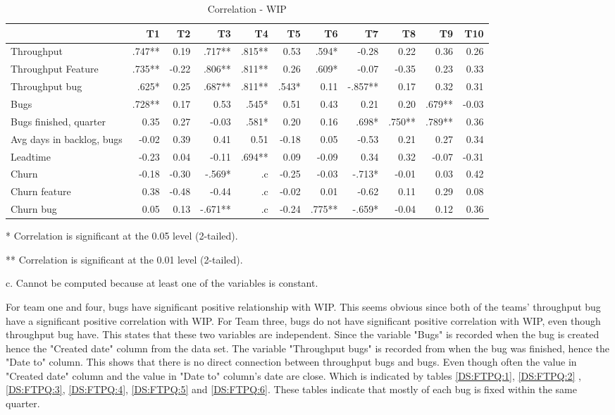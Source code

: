 \documentclass[UKenglish]{ifimaster}  %
\begin{document}
\begin{table}[!htbp]
 \begin{adjustwidth}{-2.5cm}{}
 \centering
 \begin{tabular}{|l|r|r|r|r|r|r|r|r|r|r|}
\hline
 & T1 & T2 & T3 & T4 & T5 & T6 & T7 & T8 & T9 & T10\\ \hline
Throughput &.747**& 0.19& .717**& .815**& 0.53& .594*& -0.28& 0.22& 0.36& 0.26\\ \hline
Throughput Feature &.735**& -0.22& .806**& .811**& 0.26& .609*& -0.07& -0.35& 0.23& 0.33\\ \hline
Throughput bug &.625*& 0.25& .687**& .811**& .543*& 0.11& -.857**& 0.17& 0.32& 0.31\\ \hline
Bugs &.728**& 0.17& 0.53& .545*& 0.51& 0.43& 0.21& 0.20& .679**& -0.03\\ \hline
Bugs finished, quarter &0.35& 0.27& -0.03& .581*& 0.20& 0.16& .698*& .750**& .789**& 0.36\\ \hline
Avg days in backlog, bugs &-0.02& 0.39& 0.41& 0.51& -0.18& 0.05& -0.53& 0.21& 0.27& 0.34\\ \hline
Leadtime &-0.23& 0.04& -0.11& .694**& 0.09& -0.09& 0.34& 0.32& -0.07& -0.31\\ \hline
Churn &-0.18& -0.30& -.569*& .c& -0.25& -0.03& -.713*& -0.01& 0.03& 0.42\\ \hline
Churn feature &0.38& -0.48& -0.44& .c& -0.02& 0.01& -0.62& 0.11& 0.29& 0.08\\ \hline
Churn bug &0.05& 0.13& -.671**
& .c
& -0.24& .775**
& -.659*
& -0.04& 0.12& 0.36\\ \hline
\end{tabular}
 \caption{Correlation - WIP}
\label{corr:WIP}
 \centerline {* Correlation is significant at the 0.05 level (2-tailed).}
\centerline{** Correlation is significant at the 0.01 level (2-tailed).}
\centerline{c. Cannot be computed because at least one of the variables is constant.}
\end{adjustwidth}
\end{table}


For team one and four, bugs have significant positive relationship with WIP. This seems obvious since both of the teams' throughput bug have a significant positive correlation with WIP.  For Team three, bugs do not have significant positive correlation with WIP, even though throughput bug have. This states that these two variables are independent. Since the variable "Bugs" is recorded when the bug is created hence the "Created date" column from the data set. The variable "Throughput bugs" is recorded from when the bug was finished, hence the "Date to" column. This shows that there is no direct connection between throughput bugs and bugs. Even though often the value in "Created date" column and the value in "Date to" column's date are close. Which is indicated by tables \ref{DS:FTPQ:1}, \ref{DS:FTPQ:2} , \ref{DS:FTPQ:3}, \ref{DS:FTPQ:4}, \ref{DS:FTPQ:5} and \ref{DS:FTPQ:6}. These tables indicate that mostly of each bug is fixed within the same quarter.
\end{document}

